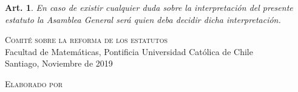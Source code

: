 \documentclass[letterpaper,11pt]{article}
\theoremstyle{plain}
\newtheorem{art}{Art.} %
\begin{document}
\begin{art}\label{}
	En caso de existir cualquier duda sobre la interpretación del presente estatuto la Asamblea General será quien deba decidir dicha interpretación.
\end{art}


\vfill
\textsc{Comité sobre la reforma de los estatutos}\\ %
Facultad de Matemáticas, Pontificia Universidad Católica de Chile\\
Santiago, Noviembre de 2019

\newpage

\begin{sloppypar}
	\textsc{Elaborado por}%

\end{sloppypar}
\end{document}

